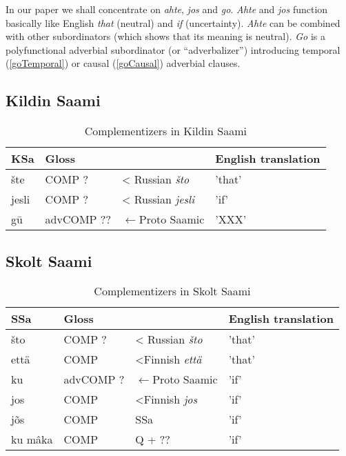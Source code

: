 \documentclass[a4,12pt]{scrartcl}
\begin{document}
In our paper we shall concentrate on {\it ahte}, {\it jos} and {\it go}. {\it Ahte} and  {\it jos}  function basically like English {\it that} (neutral) and {\it if} (uncertainty). {\it Ahte} can be combined with other subordinators (which shows that its meaning is neutral).  
{\it Go} is a polyfunctional adverbial subordinator (or “adverbalizer”) introducing temporal (\ref{goTemporal}) or causal (\ref{goCausal}) adverbial clauses.


\subsection{Kildin Saami}


\begin{table}[!ht]
\begin{tabular}{l | l l l}
\hline
\hline
KSa 		& Gloss			&						& English translation\\	%
\hline
šte		&{\sc COMP} ?		&< Russian {\it što}			&'that'\\				%
jesli		&{\sc	 COMP} ?		&< Russian {\it jesli}			&'if'\\					%
gū		&{\sc advCOMP} ??	&$\leftarrow$Proto Saamic	& 'XXX'\\				%
\hline
\hline
\end{tabular}
\label{KildinComps}
\caption{Complementizers in Kildin Saami}
\end{table}


\subsection{Skolt Saami}

\begin{table}[!ht]
\begin{tabular}{l | l l l}
\hline
\hline
SSa 		& Gloss			&						& English translation\\	%
\hline
što		&{\sc COMP} ?		&< Russian {\it što}			&'that'\\				%
että		& {\sc COMP}		&<Finnish {\it että}			& 'that'\\
ku		&{\sc	 advCOMP} ?	&$\leftarrow$Proto Saamic	&'if'\\					%
jos		& COMP			&<Finnish {\it jos}			& 'if'\\
jõs		&COMP			&SSa					& 'if'\\
ku mâka 	& COMP			& Q + ??						&'if'\\
\hline
\hline
\end{tabular}
\label{SkoltComps}
\caption{Complementizers in Skolt Saami}
\end{table}
\end{document}
